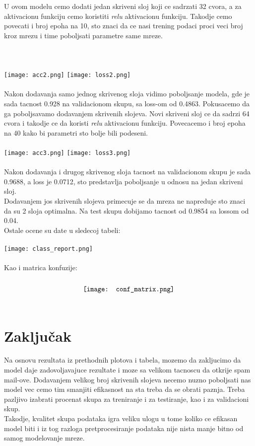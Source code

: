 \documentclass{article}
\begin{document}
U ovom modelu cemo dodati jedan skriveni sloj koji ce sadrzati 32 cvora, a za aktivacionu funkciju cemo koristiti \textit{relu} aktivacionu funkciju. Takodje cemo povecati i broj epoha na 10, sto znaci da ce nasi trening podaci proci veci broj kroz mrezu i time poboljsati parametre same mreze.\\ \\ \\ \\
\texttt{[image: acc2.png]}
\texttt{[image: loss2.png]}\\
\\
Nakon dodavanja samo jednog skrivenog sloja vidimo poboljsanje modela, gde je sada tacnost 0.928 na validacionom skupu, sa loss-om od 0.4863.
Pokusacemo da ga poboljsavamo dodavanjem skrivenih slojeva. Novi skriveni sloj ce da sadrzi 64 cvora i takodje ce da koristi \textit{relu} aktivacionu funkciju. Povecacemo i broj epoha na 40 kako bi parametri sto bolje bili podeseni.\\
\\
\texttt{[image: acc3.png]}
\texttt{[image: loss3.png]}\\
\\
Nakon dodavanja i drugog skrivenog sloja tacnost na validacionom skupu je sada 0.9688, a loss je 0.0712, sto predstavlja poboljsanje u odnosu na jedan skriveni sloj.\\
Dodavanjem jos skrivenih slojeva primecuje se da mreza ne napreduje sto znaci da su 2 sloja optimalna. Na test skupu dobijamo tacnost od 0.9854 sa lossom od 0.04.\\
Ostale ocene su date u sledecoj tabeli:\\ 
\\
\texttt{[image: class\_report.png]}\\
\\
Kao i matrica konfuzije:\\ 
\\
$$\texttt{[image: conf\_matrix.png]}\\$$
\\
\section{Zaključak}
Na osnovu rezultata iz prethodnih plotova i tabela, mozemo da zakljucimo da model daje zadovoljavajuce rezultate i moze sa velikom tacnoscu da otkrije spam mail-ove. Dodavanjem velikog broj skrivenih slojeva necemo nuzno poboljsati nas model vec cemo tim smanjiti efikasnost na sta treba da se obrati paznja. Treba pazljivo izabrati procenat skupa za treniranje i za testiranje, kao i za validacioni skup.\\ 
Takodje, kvalitet skupa podataka igra veliku ulogu u tome koliko ce efikasan model biti i iz tog razloga pretprocesiranje podataka nije nista manje bitno od samog modelovanje mreze. 


\end{document}
